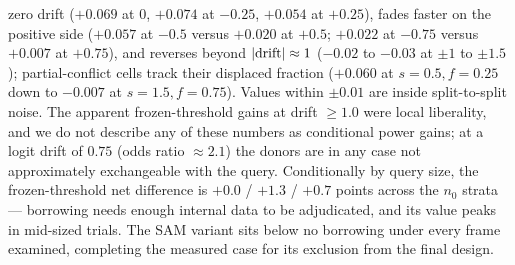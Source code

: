 \documentclass[11pt]{article}
\begin{document}
zero drift ($+0.069$ at $0$, $+0.074$ at $-0.25$, $+0.054$ at $+0.25$),
fades faster on the positive side ($+0.057$ at $-0.5$ versus $+0.020$ at
$+0.5$; $+0.022$ at $-0.75$ versus $+0.007$ at $+0.75$), and reverses
beyond $|{\rm drift}|
\approx 1$ ($-0.02$ to $-0.03$ at $\pm 1$ to $\pm 1.5$); partial-conflict
cells track their displaced fraction ($+0.060$ at $s{=}0.5, f{=}0.25$
down to $-0.007$ at $s{=}1.5, f{=}0.75$). Values within $\pm 0.01$ are
inside split-to-split noise. The apparent frozen-threshold gains at
drift $\ge 1.0$ were local liberality, and we do not describe any of
these numbers as conditional power gains; at a logit drift of $0.75$
(odds ratio $\approx 2.1$) the donors are in any case not approximately
exchangeable with the query.
Conditionally by query size, the frozen-threshold net difference
is $+0.0$ / $+1.3$ / $+0.7$ points across the $n_0$ strata --- borrowing
needs enough internal data to be adjudicated, and its value peaks in
mid-sized trials. The SAM variant sits below no borrowing under every
frame examined, completing the measured case for its exclusion from the
final design.
\end{document}
